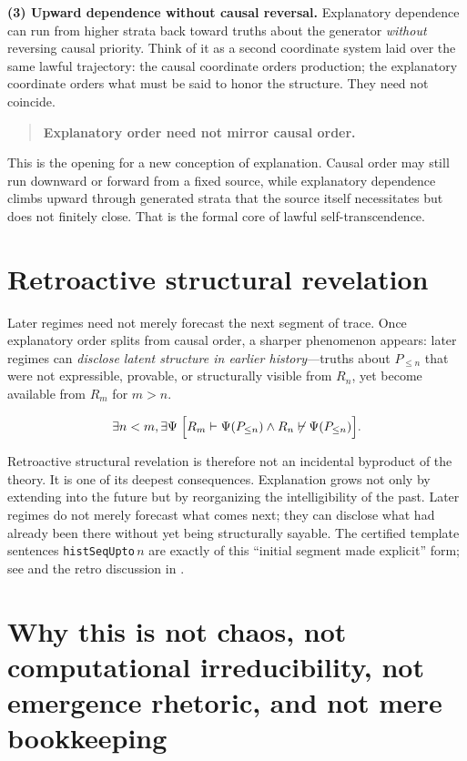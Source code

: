 \documentclass[11pt,a4paper]{article}
\theoremstyle{definition}
\begin{document}
\medskip
\noindent
\textbf{(3) Upward dependence without causal reversal.}
Explanatory dependence can run from higher strata back toward truths about the generator \emph{without} reversing causal priority. Think of it as a second coordinate system laid over the same lawful trajectory: the causal coordinate orders production; the explanatory coordinate orders what must be said to honor the structure. They need not coincide.

\begin{quote}
\textbf{Explanatory order need not mirror causal order.}
\end{quote}

This is the opening for a new conception of explanation. Causal order may still run downward or forward from a fixed source, while explanatory dependence climbs upward through generated strata that the source itself necessitates but does not finitely close. That is the formal core of lawful self-transcendence.

\section{Retroactive structural revelation}\label{sec:retro}

Later regimes need not merely forecast the next segment of trace. Once explanatory order splits from causal order, a sharper phenomenon appears: later regimes can \emph{disclose latent structure in earlier history}---truths about $P_{\le n}$ that were not expressible, provable, or structurally visible from $R_n$, yet become available from $R_m$ for $m>n$.

\[
\exists n<m,\exists\Psi\;
\Bigl[
R_m \vdash \Psi(P_{\le n})
\wedge
R_n \not\vdash \Psi(P_{\le n})
\Bigr].
\]

Retroactive structural revelation is therefore not an incidental byproduct of the theory. It is one of its deepest consequences. Explanation grows not only by extending into the future but by reorganizing the intelligibility of the past. Later regimes do not merely forecast what comes next; they can disclose what had already been there without yet being structurally sayable. The certified template sentences \texttt{histSeqUpto}\,$n$ are exactly of this ``initial segment made explicit'' form; see  and the retro discussion in .

\section{Why this is not chaos, not computational irreducibility, not emergence rhetoric, and not mere bookkeeping}\label{sec:comparisons}
\end{document}
